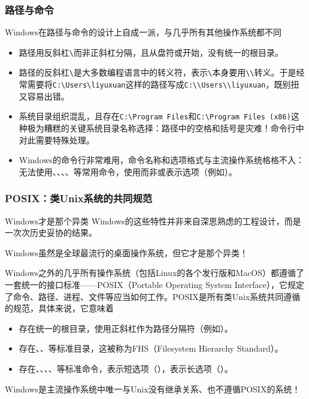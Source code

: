 \begin{frame}
    \frametitle{路径与命令}
    Windows在路径与命令的设计上自成一派，与几乎所有其他操作系统都不同
    \begin{itemize}
        \item 路径用反斜杠\texttt{\textbackslash{}}而非正斜杠\code{/}分隔，且从盘符或开始，没有统一的根目录。
        \item 路径的反斜杠\texttt{\textbackslash{}}是大多数编程语言中的转义符，表示\texttt{\textbackslash{}}本身要用\texttt{\textbackslash{}\textbackslash{}}转义。于是经常需要将\texttt{C:\textbackslash{}Users\textbackslash{}liyuxuan}这样的路径写成\texttt{C:\textbackslash{}\textbackslash{}Users\textbackslash{}\textbackslash{}liyuxuan}，既别扭又容易出错。
        \item 系统目录组织混乱，且存在\texttt{C:\textbackslash{}Program Files}和\texttt{C:\textbackslash{}Program Files (x86)}这种极为糟糕的关键系统目录名称选择：路径中的空格和括号是灾难！命令行中对此需要特殊处理。
        \item Windows的命令行非常难用，命令名称和选项格式与主流操作系统格格不入：无法使用、、、、等常用命令，使用\code{/}而非\code{-}或\code{--}表示选项（例如）。
    \end{itemize}
\end{frame}

\begin{frame}
    \frametitle{POSIX：类Unix系统的共同规范}
    \begin{vspquote}{Windows才是那个异类}
        Windows的这些特性并非来自深思熟虑的工程设计，而是一次次历史妥协的结果。
        
        Windows虽然是全球最流行的桌面操作系统，但它才是那个异类！
    \end{vspquote}
    Windows之外的几乎所有操作系统（包括Linux的各个发行版和MacOS）都遵循了一套统一的接口标准——\alert{POSIX}（Portable Operating System Interface），它规定了命令、路径、进程、文件等应当如何工作。POSIX是所有类Unix系统共同遵循的规范，具体来说，它意味着
    \begin{itemize}
        \item 存在统一的\code{/}根目录，使用正斜杠\code{/}作为路径分隔符（例如）。
        \item 存在、、等标准目录，这被称为\alert{FHS}（Filesystem Hierarchy Standard）。
        \item 存在、、、、等标准命令，\code{-}表示短选项（），\code{--}表示长选项（）。
    \end{itemize}
    Windows是主流操作系统中唯一与Unix没有继承关系、也不遵循POSIX的系统！
\end{frame}

